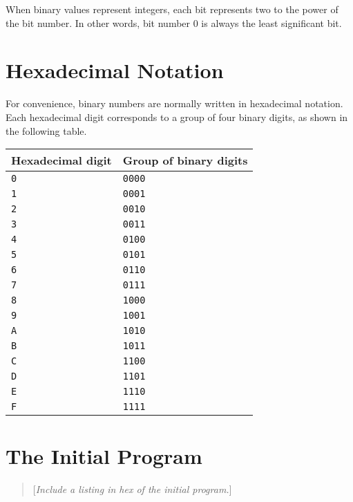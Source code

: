 \documentclass[a4paper,11pt]{article}
\newcommand{\num}[1]{\texttt{#1}\xspace}
\newcommand{\comment}[1]{\begin{quote}[\textit{#1}]\end{quote}}
\begin{document}
When binary values represent integers, each bit represents two to the power of the bit number.
In other words, bit number 0 is always the least significant bit.

\section{Hexadecimal Notation}
\label{sec:hexadecimal-notation}

For convenience, binary numbers are normally written in hexadecimal notation.
Each hexadecimal digit corresponds to a group of four binary digits, as shown in the following table.

\begin{center}
  \begin{tabular}{@{}ll@{}}
    \hline
    Hexadecimal digit & Group of binary digits \\
    \hline
    \num{0}           & \num{0000}   \\
    \num{1}           & \num{0001}   \\
    \num{2}           & \num{0010}   \\
    \num{3}           & \num{0011}   \\
    \num{4}           & \num{0100}   \\
    \num{5}           & \num{0101}   \\
    \num{6}           & \num{0110}   \\
    \num{7}           & \num{0111}   \\
    \num{8}           & \num{1000}   \\
    \num{9}           & \num{1001}   \\
    \num{A}           & \num{1010}   \\
    \num{B}           & \num{1011}   \\
    \num{C}           & \num{1100}   \\
    \num{D}           & \num{1101}   \\
    \num{E}           & \num{1110}   \\
    \num{F}           & \num{1111}   \\
    \hline
  \end{tabular}
\end{center}

\section{The Initial Program}
\label{sec:initial-program}

\comment{Include a listing in hex of the initial program.}
\end{document}
